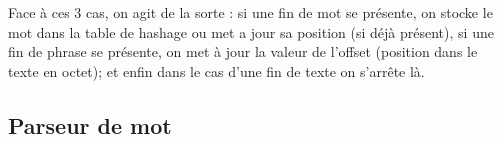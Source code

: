 \documentclass[french, 12pt, titlepage]{article}
\begin{document}
Face à ces 3 cas, on agit de la sorte : si une fin de mot se présente, on stocke le mot dans la table 
de hashage ou met a jour sa position (si déjà présent), si une fin de phrase se présente, on met à 
jour la valeur de l'offset (position dans le texte en octet); et enfin dans le cas d'une fin de texte 
on s'arrête là.

\subsection{Parseur de mot}
\end{document}
